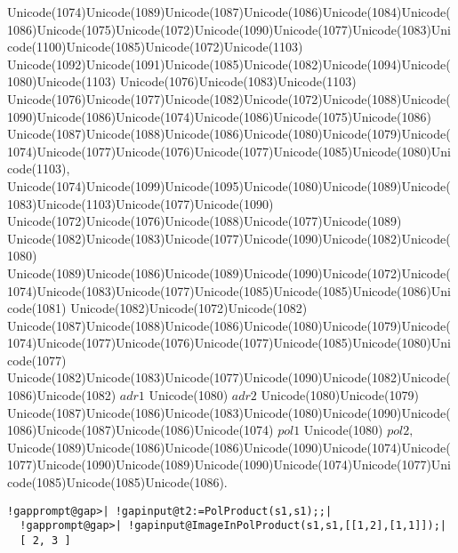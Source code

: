 \documentclass[a4paper,11pt]{report}
\begin{document}
{{{ Unicode(1074)Unicode(1089)Unicode(1087)Unicode(1086)Unicode(1084)Unicode(1086)Unicode(1075)Unicode(1072)Unicode(1090)Unicode(1077)Unicode(1083)Unicode(1100)Unicode(1085)Unicode(1072)Unicode(1103)
Unicode(1092)Unicode(1091)Unicode(1085)Unicode(1082)Unicode(1094)Unicode(1080)Unicode(1103)
Unicode(1076)Unicode(1083)Unicode(1103)
Unicode(1076)Unicode(1077)Unicode(1082)Unicode(1072)Unicode(1088)Unicode(1090)Unicode(1086)Unicode(1074)Unicode(1086)Unicode(1075)Unicode(1086)
Unicode(1087)Unicode(1088)Unicode(1086)Unicode(1080)Unicode(1079)Unicode(1074)Unicode(1077)Unicode(1076)Unicode(1077)Unicode(1085)Unicode(1080)Unicode(1103),
Unicode(1074)Unicode(1099)Unicode(1095)Unicode(1080)Unicode(1089)Unicode(1083)Unicode(1103)Unicode(1077)Unicode(1090)
Unicode(1072)Unicode(1076)Unicode(1088)Unicode(1077)Unicode(1089)
Unicode(1082)Unicode(1083)Unicode(1077)Unicode(1090)Unicode(1082)Unicode(1080)
Unicode(1089)Unicode(1086)Unicode(1089)Unicode(1090)Unicode(1072)Unicode(1074)Unicode(1083)Unicode(1077)Unicode(1085)Unicode(1085)Unicode(1086)Unicode(1081)
Unicode(1082)Unicode(1072)Unicode(1082)
Unicode(1087)Unicode(1088)Unicode(1086)Unicode(1080)Unicode(1079)Unicode(1074)Unicode(1077)Unicode(1076)Unicode(1077)Unicode(1085)Unicode(1080)Unicode(1077)
Unicode(1082)Unicode(1083)Unicode(1077)Unicode(1090)Unicode(1082)Unicode(1086)Unicode(1082) $adr1$ Unicode(1080) $adr2$ Unicode(1080)Unicode(1079)
Unicode(1087)Unicode(1086)Unicode(1083)Unicode(1080)Unicode(1090)Unicode(1086)Unicode(1087)Unicode(1086)Unicode(1074) $pol1$ Unicode(1080) $pol2,$ Unicode(1089)Unicode(1086)Unicode(1086)Unicode(1090)Unicode(1074)Unicode(1077)Unicode(1090)Unicode(1089)Unicode(1090)Unicode(1074)Unicode(1077)Unicode(1085)Unicode(1085)Unicode(1086). 
\begin{Verbatim}[commandchars=!@|,fontsize=\small,frame=single,label=Пример]
  !gapprompt@gap>| !gapinput@t2:=PolProduct(s1,s1);;|
  !gapprompt@gap>| !gapinput@ImageInPolProduct(s1,s1,[[1,2],[1,1]]);|
  [ 2, 3 ]
  						

\end{Verbatim}}}}
\end{document}
